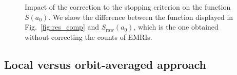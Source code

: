 \documentclass[desactivate]{aa}
\begin{document}
        \begin{figure}
            \centering
            \caption{Impact of the correction to the stopping criterion on the function $S(a_0)$. We show the difference between the function displayed in Fig.\ \ref{fig:res_comp} and $S_\mathrm{raw} (a_0)$, which is the one obtained without correcting the counts of EMRIs.}
            \label{fig:corrections}
        \end{figure} 

        \subsection{Local versus orbit-averaged approach}\label{sec:localvsave}
        
\end{document}
